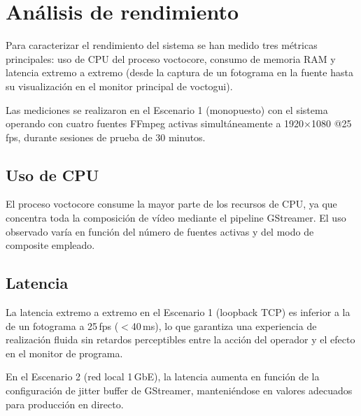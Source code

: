 \section{Análisis de rendimiento}

Para caracterizar el rendimiento del sistema se han medido tres métricas principales:
uso de CPU del proceso voctocore, consumo de memoria RAM y latencia extremo a extremo
(desde la captura de un fotograma en la fuente hasta su visualización en el monitor
principal de voctogui).

Las mediciones se realizaron en el Escenario 1 (monopuesto) con el sistema operando
con cuatro fuentes FFmpeg activas simultáneamente a 1920×1080 @25\,fps, durante
sesiones de prueba de 30 minutos.

\subsection{Uso de CPU}

El proceso voctocore consume la mayor parte de los recursos de CPU, ya que concentra
toda la composición de vídeo mediante el pipeline GStreamer. El uso observado varía
en función del número de fuentes activas y del modo de composite empleado.

\subsection{Latencia}

La latencia extremo a extremo en el Escenario 1 (loopback TCP) es inferior a la de
un fotograma a 25\,fps ($<$40\,ms), lo que garantiza una experiencia de realización
fluida sin retardos perceptibles entre la acción del operador y el efecto en el
monitor de programa.

En el Escenario 2 (red local 1\,GbE), la latencia aumenta en función de la
configuración de jitter buffer de GStreamer, manteniéndose en valores adecuados para
producción en directo.


